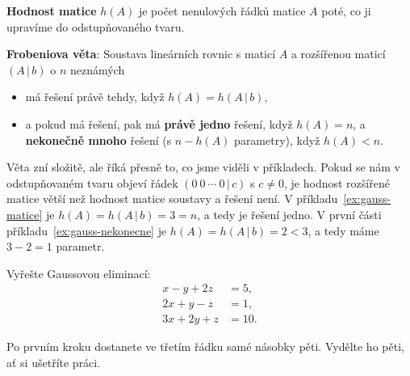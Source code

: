 \begin{definitionbox}
  \textbf{Hodnost matice} $h(A)$ je počet nenulových řádků matice $A$ poté, co ji upravíme do odstupňovaného tvaru.

  \vspace{0.2cm}

  \textbf{Frobeniova věta}: Soustava lineárních rovnic s maticí $A$ a rozšířenou maticí $(A\,|\,b)$ o $n$ neznámých
  \begin{itemize}
    \item má řešení právě tehdy, když $h(A) = h(A\,|\,b)$,
    \item a pokud má řešení, pak má \textbf{právě jedno} řešení, když $h(A) = n$, a \textbf{nekonečně mnoho} řešení (s $n - h(A)$ parametry), když $h(A) < n$.
  \end{itemize}
\end{definitionbox}

Věta zní složitě, ale říká přesně to, co jsme viděli v příkladech. Pokud se nám v odstupňovaném tvaru objeví řádek $(0\ 0\ \cdots\ 0\,|\,c)$ s $c\neq 0$, je hodnost rozšířené matice větší než hodnost matice soustavy a řešení není. V příkladu~\ref{ex:gauss-matice} je $h(A) = h(A\,|\,b) = 3 = n$, a tedy je řešení jedno. V první části příkladu~\ref{ex:gauss-nekonecne} je $h(A) = h(A\,|\,b) = 2 < 3$, a tedy máme $3 - 2 = 1$ parametr.

\begin{problem}
  Vyřešte Gaussovou eliminací:
  \begin{align*}
    x - y + 2z &= 5,\\
    2x + y - z &= 1,\\
    3x + 2y + z &= 10.
  \end{align*}
\end{problem}

\begin{hint}
  Po prvním kroku dostanete ve třetím řádku samé násobky pěti. Vydělte ho pěti, ať si ušetříte práci.
\end{hint}

